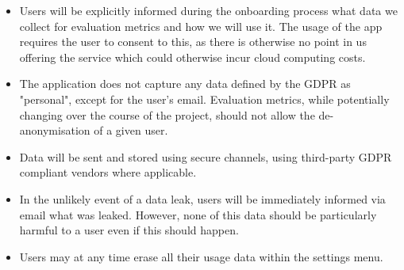 \begin{itemize}
    \item Users will be explicitly informed during the onboarding process what data we collect for evaluation metrics and how we will use it. The usage of the app requires the user to consent to this, as there is otherwise no point in us offering the service which could otherwise incur cloud computing costs.
    \item The application does not capture any data defined by the GDPR as "personal", except for the user's email. Evaluation metrics, while potentially changing over the course of the project, should not allow the de-anonymisation of a given user.
    \item Data will be sent and stored using secure channels, using third-party GDPR compliant vendors where applicable.
    \item In the unlikely event of a data leak, users will be immediately informed via email what was leaked. However, none of this data should be particularly harmful to a user even if this should happen.
    \item Users may at any time erase all their usage data within the settings menu.
\end{itemize}